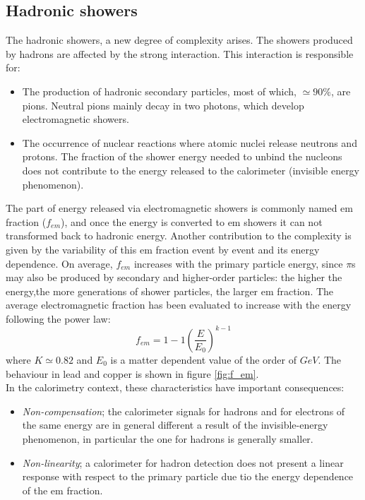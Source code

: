 \subsection{Hadronic showers} \label{subsec:had_shower}
The hadronic showers, a new degree of complexity arises. The showers produced by hadrons are affected by the strong interaction. This interaction is responsible for:
\begin{itemize}
    \item The production of hadronic secondary particles, most of which, $\simeq 90\%$, are pions. Neutral pions mainly decay in two photons, which develop electromagnetic showers.
    \item The occurrence of nuclear reactions where atomic nuclei release neutrons and protons. The fraction of the shower energy needed to unbind the nucleons does not contribute to the energy released to the calorimeter (invisible energy phenomenon).
\end{itemize}
The part of energy released via electromagnetic showers is commonly named em fraction ($f_{em}$), and once the energy is converted to em showers it can not transformed back to hadronic energy. Another contribution to the complexity is given by the variability of this em fraction event by event and its energy dependence. On average, $f_{em}$ increases with the primary particle energy, since $\pi$s may also be produced by secondary and higher-order particles: the higher the energy,the more generations of shower particles, the larger em fraction. The  average  electromagnetic fraction has been evaluated to increase with the energy following the power law:
\begin{equation}
    f_{em} = 1 -1\left(\frac{E}{E_0}\right)^{k-1}
\end{equation}
where $K\simeq 0.82$ and $E_0$ is a matter dependent value of the order of $GeV$. The behaviour in lead and copper is shown in figure \ref{fig:f_em}.\\
In the calorimetry context, these characteristics have important consequences:
\begin{itemize}
    \item \textit{Non-compensation}; the calorimeter signals for hadrons and for electrons of the same energy are in general different a result of the invisible-energy phenomenon, in particular the one for hadrons is generally smaller.
    \item \textit{Non-linearity}; a calorimeter for hadron detection does not present a linear response with respect to the primary particle due tio the energy dependence of the em fraction.
\end{itemize}

